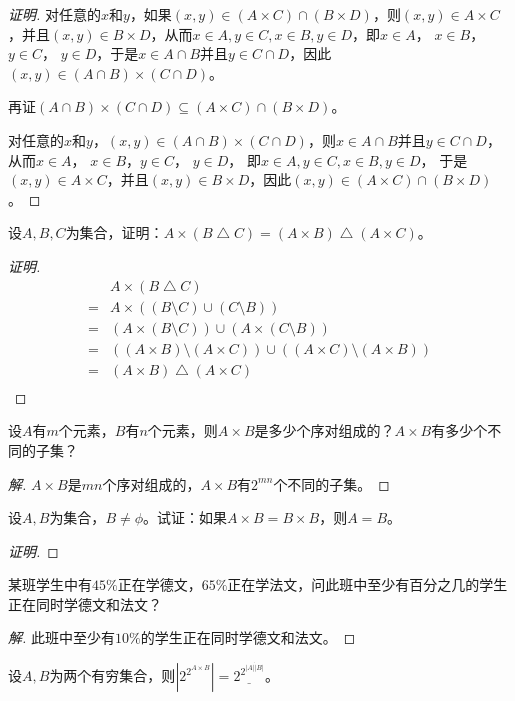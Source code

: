 \documentclass{article}
\begin{document}
\begin{CJK}{UTF8}{gbsn}
\begin{proof}[证明]
  对任意的$x$和$y$，如果$(x,y)\in (A\times C)\cap (B \times D)$，则$(x,y)\in A\times C$，并且$(x,y)\in B \times D$，从而$x\in A,y\in C, x \in B, y\in D$，即$x\in A$， $x \in B$，$ y\in C$， $y\in D$，于是$x \in A\cap B$并且$y \in C \cap D$，因此$(x,y) \in (A\cap B) \times (C \cap D)$。
  
  再证$(A\cap B) \times (C \cap D) \subseteq (A\times C)\cap (B \times D)$。
  
    对任意的$x$和$y$，$(x,y) \in (A\cap B) \times (C \cap D)$，则$x\in A\cap B$并且$y \in C \cap D$，从而$x\in A$， $x \in B$，$ y\in C$， $y\in D$， 即$x\in A,y\in C, x \in B, y\in D$，
  于是$(x,y)\in A\times C$，并且$(x,y)\in B \times D$，因此$(x,y)\in (A\times C)\cap (B \times D)$。
  
\end{proof}
\begin{Exercise}
  设$A,B,C$为集合，证明：$A\times(B\bigtriangleup C) = (A\times B)\bigtriangleup(A\times C)$。
\end{Exercise}
\begin{proof}[证明]
  \begin{align*}
    &A\times(B\bigtriangleup C)\\
    =&A\times((B\setminus C) \cup (C\setminus B))\\
    =&(A\times (B\setminus C)) \cup (A\times (C\setminus B))\\
    =&((A\times B)\setminus (A\times C)) \cup ((A\times C)\setminus (A\times B))\\
    =&(A\times B)\bigtriangleup(A\times C)\\
  \end{align*}
\end{proof}
\begin{Exercise}
  设$A$有$m$个元素，$B$有$n$个元素，则$A\times B$是多少个序对组成的？$A\times B$有多少个不同的子集？
\end{Exercise}
\begin{proof}[解]
  $A\times B$是$mn$个序对组成的，$A\times B$有$2^{mn}$个不同的子集。
\end{proof}
\begin{Exercise}
  设$A,B$为集合，$B\neq \phi$。试证：如果$A\times B= B\times B$，则$A=B$。
\end{Exercise}
\begin{proof}[证明]
\end{proof}
\begin{Exercise}
  某班学生中有$45\%$正在学德文，$65\%$正在学法文，问此班中至少有百分之几的学生正在同时学德文和法文？
\end{Exercise}
\begin{proof}[解]
  此班中至少有$10\%$的学生正在同时学德文和法文。
\end{proof}
\begin{Exercise}
  设$A,B$为两个有穷集合，则$|2^{2^{A\times B}}|=\underline{2^{2^{|A|\dot|B|}}}$。
\end{Exercise}


\end{CJK}
\end{document}
